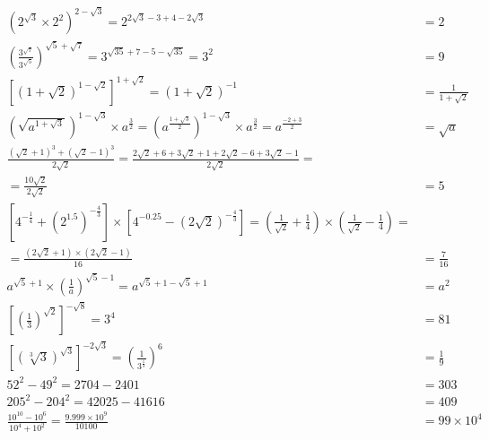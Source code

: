 \documentclass[a4paper,12pt]{article}
\begin{document}
\subsection{} %

\begin{align*}
(2^{\sqrt{3}} \times 2^2)^{2 - \sqrt{3}}
= 2^{2\sqrt{3} - 3 + 4 - 2\sqrt{3}}
&= 2 \\[6pt]
\left( \frac{3^{\sqrt{7}}}{3^{\sqrt{5}}} \right)^{\sqrt{5} + \sqrt{7}}
= 3^{\sqrt{35} + 7 - 5 - \sqrt{35}}
= 3^2
&= 9
 \\[6pt]
\left[ (1 + \sqrt{2})^{1 - \sqrt{2}} \right]^{1 + \sqrt{2}}
= (1 + \sqrt{2})^{-1}
&= \frac{1}{1 + \sqrt{2}} \\[6pt]
\left( \sqrt{a^{1 + \sqrt{3}}} \right)^{1 - \sqrt{3}} \times a^{\frac{3}{2}}
= \left( a^{\frac{1 + \sqrt{3}}{2}} \right)^{1 - \sqrt{3}} \times a^{\frac{3}{2}}
= a^{\frac{-2 + 3}{2}}
&= \sqrt{a} \\[6pt]
\frac{\left( \sqrt{2} + 1 \right)^3 + \left( \sqrt{2} - 1 \right)^3}{2\sqrt{2}}
= \frac{2\sqrt{2} + 6 + 3\sqrt{2} + 1 + 2\sqrt{2} - 6 + 3\sqrt{2} - 1}{2\sqrt{2}}= \\[6pt]
= \frac{10\sqrt{2}}{2\sqrt{2}}
&= 5 \\[6pt]
[4^{-\frac{1}{4}} + (2^{1.5})^{-\frac{4}{3}}] \times [4^{-0.25} - (2\sqrt{2})^{-\frac{4}{3}}]
= \left( \frac{1}{\sqrt{2}} + \frac{1}{4} \right) \times \left( \frac{1}{\sqrt{2}} - \frac{1}{4} \right)= \\[6pt]
= \frac{(2\sqrt{2} + 1) \times (2\sqrt{2} - 1)}{16}
&= \frac{7}{16} \\[6pt]
a^{\sqrt{5} + 1} \times \left( \frac{1}{a} \right)^{\sqrt{5} - 1}
= a^{\sqrt{5} + 1 - \sqrt{5} + 1}
&= a^2 \\[6pt]
\left[ \left( \frac{1}{3} \right)^{\sqrt{2}} \right]^{-\sqrt{8}}
= 3^4
&= 81 \\[6pt]
\left[ \left( \sqrt[3]{3} \right)^{\sqrt{3}} \right]^{-2\sqrt{3}}
= \left( \frac{1}{3^{\frac{1}{3}}} \right)^6
&= \frac{1}{9} \\[6pt]
52^2 - 49^2
= 2704 - 2401
&= 303 \\[6pt]
205^2 - 204^2
= 42025 - 41616
&= 409 \\[6pt]
\frac{10^{10} - 10^6}{10^4 + 10^2}
= \frac{9.999 \times 10^9}{10100}
&= 99 \times 10^4
\end{align*}

\subsection{} %
\end{document}
